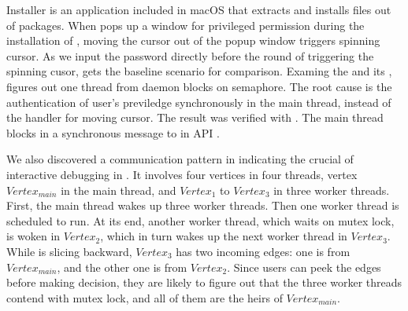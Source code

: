 Installer is an application included in macOS that extracts and installs
files out of  packages. When  pops up a window for
privileged permission during the installation of ,
moving the cursor out of the popup window triggers spinning cursor. As we
input the password directly before the round of triggering the spinning cusor,
\xxx gets the baseline scenario for comparison. Examing the \spinningnode
and its \similarnode, \xxx figures out one thread from daemon 
blocks on semaphore. The root cause is the authentication of user's previledge
synchronously in the main thread, instead of the handler for moving cursor. The
result was verified with . The main thread blocks in a synchronous
message to  in API .

We also discovered a communication pattern in  indicating the
crucial of interactive debugging in \xxx. It involves four vertices in four
threads, vertex $Vertex_{main}$ in the main thread, and $Vertex_1$ to $Vertex_3$
in three worker threads. First, the main thread wakes up three worker threads.
Then one worker thread is scheduled to run. At its end, another worker thread,
which waits on mutex lock, is woken in $Vertex_2$, which in turn wakes up the
next worker thread in $Vertex_3$. While \xxx is slicing backward, $Vertex_3$
has two incoming edges: one is from $Vertex_{main}$, and the other one is from
$Vertex_2$. Since users can peek the edges before making decision, they are
likely to figure out that the three worker threads contend with mutex lock, and
all of them are the heirs of $Vertex_{main}$.
